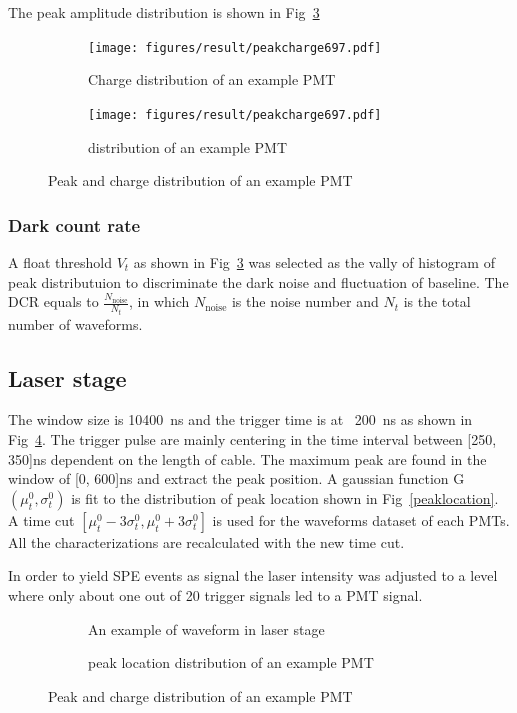 The peak amplitude distribution is shown in Fig~\ref{fig:peak}
\begin{figure}[!htbp]
    \centering
    \begin{subfigure}[t]{0.45\textwidth}
        \texttt{[image: figures/result/peakcharge697.pdf]}
        \caption{Charge distribution of an example PMT}%
        \label{fig:charge}
    \end{subfigure}
    \begin{subfigure}[t]{0.45\textwidth}
        \texttt{[image: figures/result/peakcharge697.pdf]}
        \caption{ distribution of an example PMT}%
        \label{fig:peak}
    \end{subfigure}
    \caption{Peak and charge distribution of an example PMT}
\end{figure}
\subsubsection{Dark count rate}
A float threshold $V_{t}$ as shown in Fig~\ref{fig:peak} was selected as the vally of histogram of peak distributuion to discriminate the dark noise and fluctuation of baseline. The DCR equals to $\frac{N_{\mathrm{noise}}}{N_{t}}$, in which $N_{\mathrm{noise}}$ is the noise number and $N_{t}$ is the total number of waveforms.

\subsection{Laser stage}
The window size is \SI{10400}{ns} and the trigger time is at ~\SI{200}{ns} as shown in Fig~\ref{fig:triggerwaveform}. The trigger pulse are mainly centering in the time interval between [250, 350]ns dependent on the length of cable. The maximum peak are found in the window of [0, 600]ns and extract the peak position. A gaussian function G$(\mu_t^0,\sigma_t^0)$ is fit to the distribution of peak location shown in Fig~\ref{peaklocation}. A time cut $[\mu_t^0-3\sigma_t^0, \mu_t^0+3\sigma_t^0]$ is used for the waveforms dataset of each PMTs. All the characterizations are recalculated with the new time cut.

In order to yield SPE events as signal the laser intensity was adjusted to a level where only
about one out of 20 trigger signals led to a PMT signal.

\begin{figure}
    \centering
    \begin{subfigure}[b]{0.35\textwidth}
        \caption{An example of waveform in laser stage}
        \label{fig:triggerwaveform}
    \end{subfigure}
    \begin{subfigure}[b]{0.35\textwidth}
        \caption{peak location distribution of an example PMT}%
        \label{fig:peaklocation}
    \end{subfigure}
    \caption{Peak and charge distribution of an example PMT}
\end{figure}
